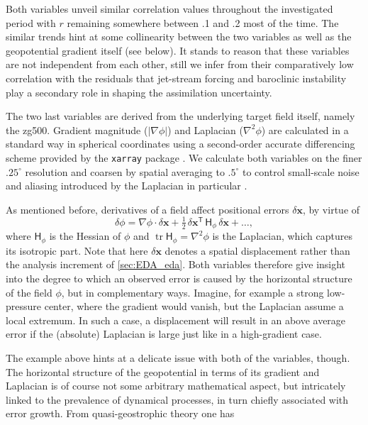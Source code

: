 Both variables unveil similar correlation values throughout the investigated period with $r$ remaining somewhere between .1 and .2 most of the time. The similar trends hint at some collinearity between the two variables as well as the geopotential gradient itself (see below). It stands to reason that these variables are not independent from each other, still we infer from their comparatively low correlation with the residuals that jet-stream forcing and baroclinic instability play a secondary role in shaping the assimilation uncertainty.

The two last variables are derived from the underlying target field itself, namely the \gls{zg500}. Gradient magnitude ($|\nabla \phi|$) and Laplacian ($\nabla^2 \phi$) are calculated in a standard way in spherical coordinates \parencite[ch.~C.3]{holtonIntroductionDynamicMeteorology2013} using a second-order accurate differencing scheme provided by the \texttt{xarray} package \parencite{hoyerXarrayNDLabeled2017}. We calculate both variables on the finer $.25^\circ$ resolution and coarsen by spatial averaging to $.5^\circ$ to control small-scale noise and aliasing introduced by the Laplacian in particular \parencite[ch.~3]{ferzigerComputationalMethodsFluid2020}.

As mentioned before, derivatives of a field affect positional errors
$\delta\mathbf{x}$, by virtue of
\begin{equation} \label{eq:Taylor}
    \delta\phi = \nabla\phi \cdot \delta\mathbf{x}
    + \tfrac{1}{2}\,\delta\mathbf{x}^{\mathsf T}\,
    \mathsf{H}_\phi\,\delta\mathbf{x} + \ldots,
\end{equation}
where $\mathsf{H}_\phi$ is the Hessian of $\phi$ and
$\operatorname{tr}\mathsf{H}_\phi = \nabla^2\phi$ is the Laplacian,
which captures its isotropic part. Note that here $\delta\mathbf{x}$
denotes a spatial displacement rather than the analysis increment of
\cref{sec:EDA_eda}. Both variables therefore give insight into the degree to which an observed error is caused by the horizontal structure of the field $\phi$, but in complementary ways. Imagine, for example a strong low-pressure center, where the gradient would vanish, but the Laplacian assume a local extremum. In such a case, a displacement will result in an above average error if the (absolute) Laplacian is large just like in a high-gradient case.

The example above hints at a delicate issue with both of the variables, though. The horizontal structure of the geopotential  in terms of its gradient and Laplacian is of course not some arbitrary mathematical aspect, but intricately linked to the prevalence of dynamical processes, in turn chiefly associated with error growth. From quasi-geostrophic theory one has \parencite[][ch.~6]{holtonIntroductionDynamicMeteorology2013}


